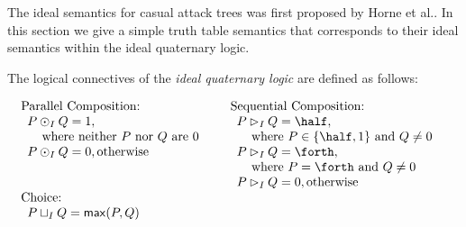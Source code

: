 The ideal semantics for casual attack trees was first proposed by
Horne et al.\cite{horne2017semantics}.  In this section we give a
simple truth table semantics that corresponds to their ideal semantics
within the ideal quaternary logic.

\begin{definition}
  \label{def:ideal-semantics}
  The logical connectives of the \emph{ideal quaternary logic} are
  defined as follows:\vspace{-5px}
  \begin{center}
    \begin{math}
      \setlength{\arraycolsep}{5px}
      \begin{array}{lll}
        \begin{array}{lll}
          \text{Parallel Composition:}\\
          \begin{array}{lll}
            P \odot_I Q = 1,\\
            \,\,\,\,\,\,\,\text{where neither $P$ nor $Q$ are $0$}\\
            P \odot_I Q = 0, \text{otherwise}\\\\\\
          \end{array}
        \end{array}
        &
        \begin{array}{lll}
          \text{Sequential Composition:}\\
          \begin{array}{lll}          
            P \rhd_I Q = \half,\\
            \,\,\,\,\,\,\,\text{where } P \in \{\half, 1\} \text{ and } Q \neq 0\\            
            P \rhd_I Q = \forth,\\
            \,\,\,\,\,\,\,\text{where } P = \forth \text{ and } Q \neq 0\\
            P \rhd_I Q = 0, \text{otherwise}\\
          \end{array}
        \end{array}
        \\[30px]
        \begin{array}{lll}
          \text{Choice:}\\    
          \begin{array}{lll}
            P \sqcup_I Q = \mathsf{max}(P,Q)
          \end{array}
        \end{array}
      \end{array}
    \end{math}
  \end{center}        
\end{definition}
